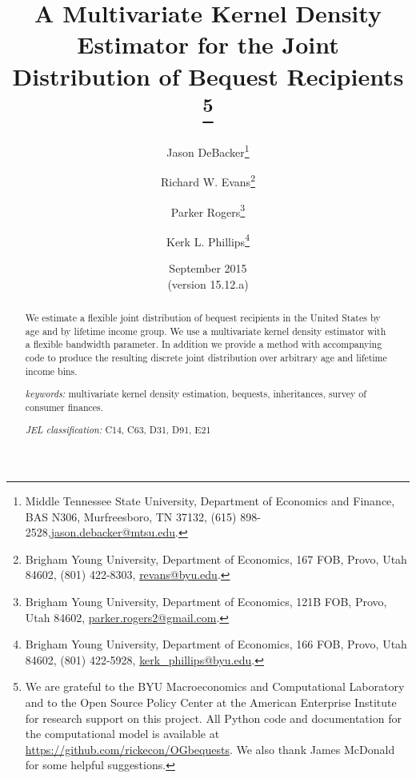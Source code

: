 \documentclass[letterpaper,12pt]{article}
\theoremstyle{definition}
\begin{document}
\begin{titlepage}
\title{A Multivariate Kernel Density Estimator for the Joint Distribution of Bequest Recipients
       \thanks{
       We are grateful to the BYU Macroeconomics and Computational Laboratory and to the Open Source Policy Center at the American Enterprise Institute for research support on this project. All Python code and documentation for the computational model is available at \href{https://github.com/rickecon/OGbequests}{https://github.com/rickecon/OGbequests}. We also thank James McDonald for some helpful suggestions.}
       }
\author{
  Jason DeBacker\footnote{Middle Tennessee State University, Department of Economics and Finance, BAS N306, Murfreesboro, TN 37132, (615) 898-2528,\href{mailto:jason.debacker@mtsu.edu}{jason.debacker@mtsu.edu}.} \\[-2pt]
  \and
  Richard W. Evans\footnote{Brigham Young University, Department of Economics, 167 FOB, Provo, Utah 84602, (801) 422-8303, \href{mailto:revans@byu.edu}{revans@byu.edu}.} \\[-2pt]
  \and
  Parker Rogers\footnote{Brigham Young University, Department of Economics, 121B FOB, Provo, Utah 84602, \href{mailto:parker.rogers2@gmail.com}{parker.rogers2@gmail.com}.} \\[-2pt]
  \and
  Kerk L. Phillips\footnote{Brigham Young University, Department of Economics, 166 FOB, Provo, Utah 84602, (801) 422-5928, \href{mailto:kerk_phillips@byu.edu}{kerk\_phillips@byu.edu}.} \\[-2pt]}
\date{September 2015 \\
  \scriptsize{(version 15.12.a)}}
\maketitle
\vspace{-9mm}
\begin{abstract}
\footnotesize{We estimate a flexible joint distribution of bequest recipients in the United States by age and by lifetime income group. We use a multivariate kernel density estimator with a flexible bandwidth parameter. In addition we provide a method with accompanying code to produce the resulting discrete joint distribution over arbitrary age and lifetime income bins.

\vspace{3mm}

\noindent\textit{keywords:}\: multivariate kernel density estimation, bequests, inheritances, survey of consumer finances.

\vspace{3mm}

\noindent\textit{JEL classification:} C14, C63, D31, D91, E21}
\end{abstract}
\thispagestyle{empty}
\end{titlepage}
\end{document}
